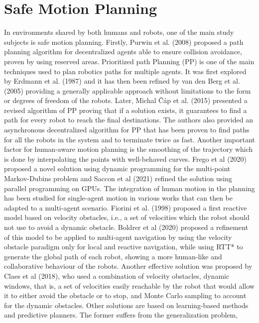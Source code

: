 \section{Safe Motion Planning}
In environments shared by both humans and robots, one of the main study
subjects is safe motion planning. Firstly, Purwin et al. (2008) proposed a path
planning algorithm for decentralized agents able to ensure collision avoidance,
proven by using reserved areas. Prioritized path Planning (PP) is one of the
main techniques used to plan robotics paths for multiple agents. It was first
explored by Erdmann et al. (1987) and it has then been refined by van den Berg
et al. (2005) providing a generally applicable approach without limitations to
the form or degrees of freedom of the robots. Later, Michal Čáp et al. (2015)
presented a revised algorithm of PP proving that if a solution exists, it
guarantees to find a path for every robot to reach the final destinations. The
authors also provided an asynchronous decentralized algorithm for PP that has
been proven to find paths for all the robots in the system and to terminate
twice as fast. Another important factor for human-aware motion planning is the
smoothing of the trajectory which is done by interpolating the points with
well-behaved curves. Frego et al (2020) proposed a novel solution using dynamic
programming for the multi-point Markov-Dubins problem and Saccon et al (2021)
refined the solution using parallel programming on GPUs. \newline
The integration of human motion in the planning has been studied for
single-agent motion in various works that can then be adapted to a multi-agent
scenario. Fiorini et al. (1998) proposed a first reactive model based on
velocity obstacles, i.e., a set of velocities which the robot should not use to
avoid a dynamic obstacle. Boldrer et al (2020) proposed a refinement of this
model to be applied to multi-agent navigation by using the velocity obstacle
paradigm only for local and reactive navigation, while using RTT* to generate
the global path of each robot, showing a more human-like and collaborative
behaviour of the robots. Another effective solution was proposed by Claes et al
(2018), who used a combination of velocity obstacles, dynamic windows, that is,
a set of velocities easily reachable by the robot that would allow it to either
avoid the obstacle or to stop, and Monte Carlo sampling to account for the
dynamic obstacles. Other solutions are based on learning-based methods and
predictive planners. The former suffers from the generalization problem,
